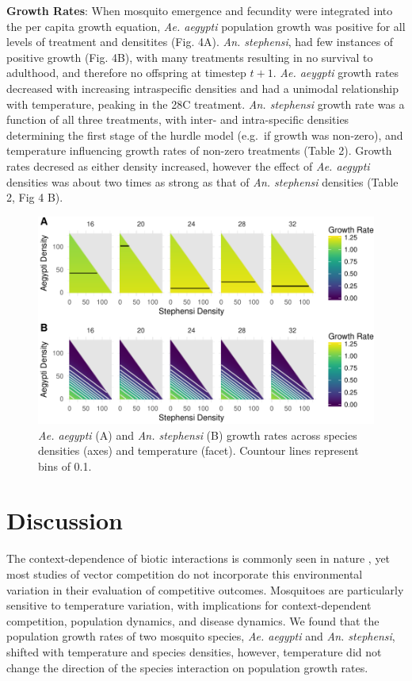 \documentclass[12pt,]{article}
\begin{document}
\textbf{Growth Rates}: When mosquito emergence and fecundity were
integrated into the per capita growth equation, \emph{Ae. aegypti}
population growth was positive for all levels of treatment and
densitites (Fig. 4A). \emph{An. stephensi}, had few instances of
positive growth (Fig. 4B), with many treatments resulting in no survival
to adulthood, and therefore no offspring at timestep \(t+1\). \emph{Ae.
aeygpti} growth rates decreased with increasing intraspecific densities
and had a unimodal relationship with temperature, peaking in the 28C
treatment. \emph{An. stephensi} growth rate was a function of all three
treatments, with inter- and intra-specific densities determining the
first stage of the hurdle model (e.g.~if growth was non-zero), and
temperature influencing growth rates of non-zero treatments (Table 2).
Growth rates decresed as either density increased, however the effect of
\emph{Ae. aegypti} densities was about two times as strong as that of
\emph{An. stephensi} densities (Table 2, Fig 4 B).

\begin{figure}[htbp]
\centering
\includegraphics{manuscript_files/figure-latex/fig4-1.pdf}
\caption{\emph{Ae. aegypti} (A) and \emph{An. stephensi} (B) growth
rates across species densities (axes) and temperature (facet). Countour
lines represent bins of 0.1.}
\end{figure}



\section{Discussion}\label{discussion}

The context-dependence of biotic interactions is commonly seen in nature
\citep{chamberlain2014}, yet most studies of vector competition do not
incorporate this environmental variation in their evaluation of
competitive outcomes. Mosquitoes are particularly sensitive to
temperature variation, with implications for context-dependent
competition, population dynamics, and disease dynamics. We found that
the population growth rates of two mosquito species, \emph{Ae. aegypti}
and \emph{An. stephensi}, shifted with temperature and species
densities, however, temperature did not change the direction of the
species interaction on population growth rates.
\end{document}
